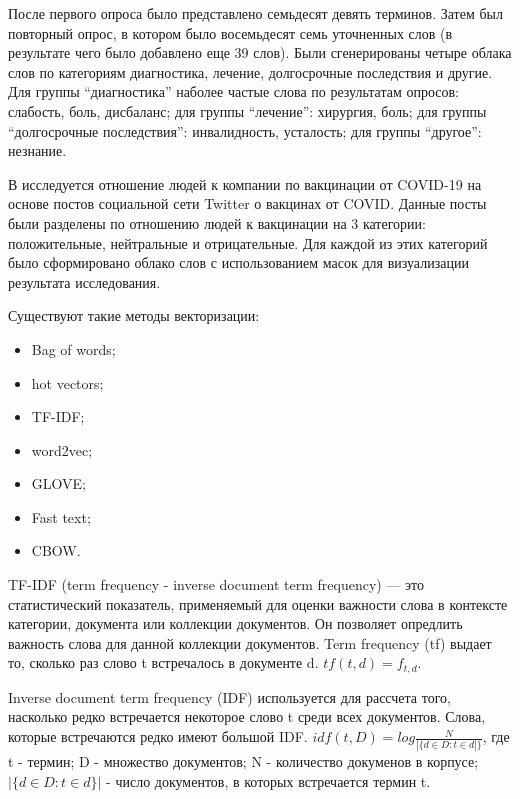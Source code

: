 \documentclass[bachelor, och, coursework ]{SCWorks}
\begin{document}
После первого опроса было представлено семьдесят девять терминов. Затем был повторный опрос, в котором было восемьдесят семь уточненных слов (в результате чего было добавлено еще 39 слов). Были сгенерированы четыре облака слов по категориям диагностика, лечение, долгосрочные последствия и другие. Для группы ``диагностика'' наболее частые слова по результатам опросов: слабость, боль, дисбаланс; для группы ``лечение'': хирургия, боль; для группы ``долгосрочные последствия'': инвалидность, усталость; для группы ``другое'': незнание. 

В \cite{6} исследуется отношение людей к компании по вакцинации от COVID-19 на основе постов социальной сети Twitter о вакцинах от COVID. Данные посты были разделены по отношению людей к вакцинации на 3 категории: положительные, нейтральные и отрицательные. Для каждой из этих категорий было сформировано облако слов с использованием масок для визуализации результата исследования.









Существуют такие методы векторизации:
{\begin{itemize}
    \item Bag of words;
    \item hot vectors;
    \item TF-IDF;
    \item word2vec;
    \item GLOVE;
    \item Fast text;
    \item CBOW.
\end{itemize}}


TF-IDF (term frequency - inverse document term frequency) --- это статистический показатель, применяемый для оценки важности слова в контексте категории, документа или коллекции документов. Он позволяет опредлить важность слова для данной коллекции документов. 
Term frequency (tf) выдает то, сколько раз слово t встречалось в документе d.
$tf(t, d) = f_{t, d}$.

Inverse document term frequency (IDF) используется для рассчета того, насколько редко встречается некоторое слово t среди всех документов. Слова, которые встречаются редко имеют большой IDF.
$idf(t, D) = log\frac{N}{|\{d\in D:t\in d|\}}$, где t - термин; D - множество документов; N - количество докуменов в корпусе; $|\{d\in D:t\in d\}|$ - число документов, в которых встречается термин t.
\end{document}

